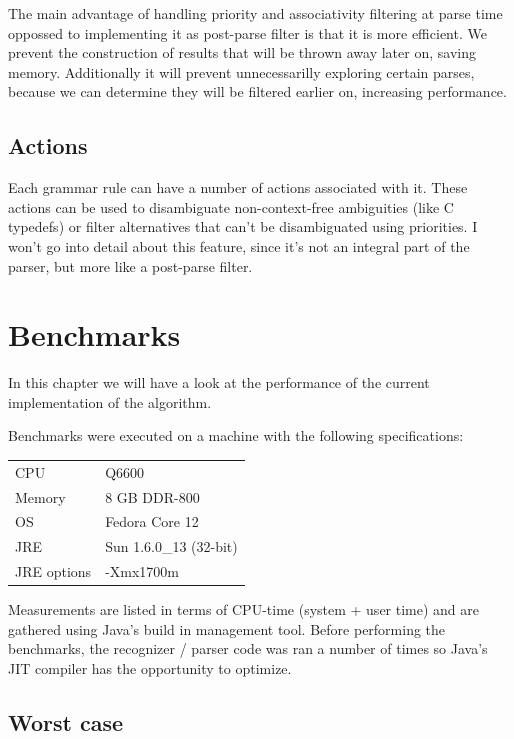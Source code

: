\documentclass[a4paper,10pt]{article}
\begin{document}
The main advantage of handling priority and associativity filtering at parse time oppossed to implementing it as post-parse filter is that it is more efficient. We prevent the construction of results that will be thrown away later on, saving memory. Additionally it will prevent unnecessarilly exploring certain parses, because we can determine they will be filtered earlier on, increasing performance.

\subsection{Actions}

Each grammar rule can have a number of actions associated with it. These actions can be used to disambiguate non-context-free ambiguities (like C typedefs) or filter alternatives that can't be disambiguated using priorities. I won't go into detail about this feature, since it's not an integral part of the parser, but more like a post-parse filter.

\section{Benchmarks}

In this chapter we will have a look at the performance of the current implementation of the algorithm.

Benchmarks were executed on a machine with the following specifications:
\begin{table}[H]
\centering
\begin{tabular}{ | p{6em} | p{9em} | }
 \hline
 CPU & Q6600 \\
 Memory & 8 GB DDR-800 \\
 OS & Fedora Core 12 \\
 JRE & Sun 1.6.0\_13 (32-bit) \\
 JRE options & -Xmx1700m \\
 \hline
\end{tabular}
\end{table}

Measurements are listed in terms of CPU-time (system + user time) and are gathered using Java's build in management tool. Before performing the benchmarks, the recognizer / parser code was ran a number of times so Java's JIT compiler has the opportunity to optimize.

\subsection{Worst case}
\end{document}
